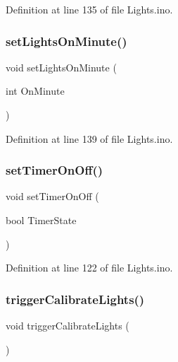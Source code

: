 Definition at line 135 of file Lights.\+ino.

\mbox{\label{_lights_8ino_abcc7306705a29bd99aeced1bbc6db3ef}} 
\subsubsection{\texorpdfstring{setLightsOnMinute()}{setLightsOnMinute()}}
{\footnotesize\ttfamily void set\+Lights\+On\+Minute (\begin{DoxyParamCaption}\item[{int}]{On\+Minute }\end{DoxyParamCaption})}



Definition at line 139 of file Lights.\+ino.

\mbox{\label{_lights_8ino_a6c067cff06262537a37378bb1b6e9c1c}} 
\subsubsection{\texorpdfstring{setTimerOnOff()}{setTimerOnOff()}}
{\footnotesize\ttfamily void set\+Timer\+On\+Off (\begin{DoxyParamCaption}\item[{bool}]{Timer\+State }\end{DoxyParamCaption})}



Definition at line 122 of file Lights.\+ino.

\mbox{\label{_lights_8ino_a19b4105316888247ed0b361793002319}} 
\subsubsection{\texorpdfstring{triggerCalibrateLights()}{triggerCalibrateLights()}}
{\footnotesize\ttfamily void trigger\+Calibrate\+Lights (\begin{DoxyParamCaption}{ }\end{DoxyParamCaption})}



